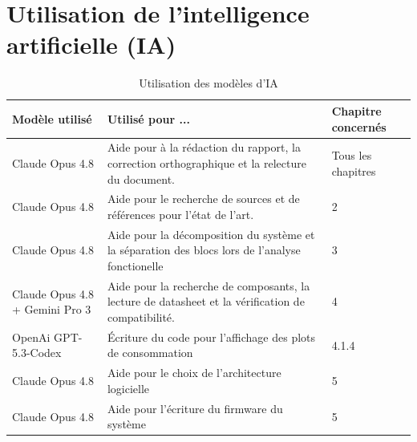 \chapter*{Utilisation de l'intelligence artificielle (IA)}

\begin{table}[ht]
    \begin{center}
        \caption{Utilisation des modèles d'IA}
        \begin{tabular}{m{}m{}m{}}
            \toprule
            \textbf{Modèle utilisé}        & \textbf{Utilisé pour ...}                                                                          & \textbf{Chapitre concernés} \\
            \midrule
            Claude Opus 4.8                & Aide pour à la rédaction du rapport, la correction orthographique et la relecture du document.     & Tous les \newline chapitres \\
            Claude Opus 4.8                & Aide pour le recherche de sources et de références pour l'état de l'art.                           & 2                           \\
            
            Claude Opus 4.8                & Aide pour la décomposition du système et la séparation des blocs lors de l'analyse fonctionelle    & 3                           \\
            Claude Opus 4.8 + Gemini Pro 3 & Aide pour la recherche de composants, la lecture de datasheet et la vérification de compatibilité. & 4                           \\
            OpenAi GPT-5.3-Codex           & Écriture du code pour l'affichage des plots de consommation                                        & 4.1.4                       \\
            Claude Opus 4.8                & Aide pour le choix de l'architecture logicielle                                                    & 5                           \\
            Claude Opus 4.8                & Aide pour l'écriture du firmware du système                                                        & 5                           \\
            \bottomrule
        \end{tabular}
    \end{center}
\end{table}